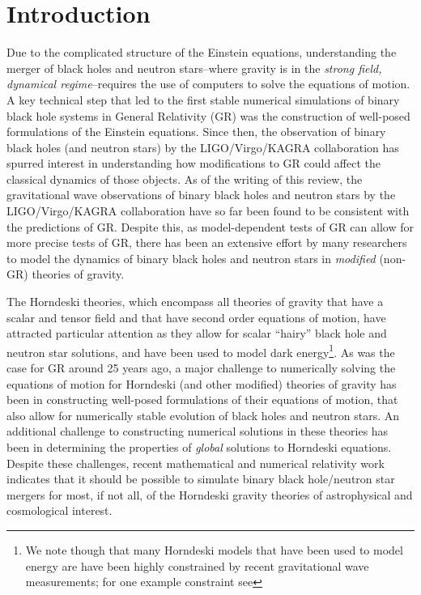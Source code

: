 \documentclass{ws-ijmpd}
\begin{document}
\section{Introduction	
   \label{sec:introduction}
}
Due to the complicated structure of the Einstein equations,
understanding the merger of black holes and neutron stars--where 
gravity is in the
\emph{strong field, dynamical regime}--requires the use of
computers to solve the equations of motion\cite{alcubierre2008introduction,
baumgarte2010numerical}. 
A key technical step that led to the first stable numerical
simulations of binary black hole systems in General Relativity (GR)
was the construction of well-posed formulations of the  Einstein 
equations\cite{Pretorius:2005gq,
Campanelli:2005dd,Baker:2005vv,Pretorius:2007nq}.
Since then, the observation of binary black holes (and neutron stars)
by the LIGO/Virgo/KAGRA
collaboration\cite{LIGOScientific:2016aoc,
LIGOScientific:2016sjg,LIGOScientific:2017vwq} 
has spurred interest in understanding how modifications to GR
could affect the classical dynamics of those objects\cite{Yunes:2013dva,
Berti:2015itd,Foucart:2022iwu}. 
As of the writing of this review,
the gravitational wave observations of binary black holes and neutron
stars by the LIGO/Virgo/KAGRA collaboration have so far
been found to be consistent with the predictions of 
GR\cite{Yunes:2013dva,LIGOScientific:2016lio,LIGOScientific:2019fpa,
LIGOScientific:2020tif,Krishnendu:2021fga}.
Despite this,  
as model-dependent tests of GR can allow for more precise tests of GR,
there has been an extensive effort by many researchers
to model the dynamics of binary black holes
and neutron stars in \emph{modified} (non-GR) 
theories of gravity\cite{Berti:2015itd,Foucart:2022iwu}.

The Horndeski theories\cite{horndeski_paper,Deffayet:2009wt,Deffayet:2011gz},
which encompass all theories of gravity
that have a scalar and tensor field and that have second 
order equations of motion, have attracted particular attention
as they allow for scalar ``hairy'' black hole and neutron
star solutions\cite{Damour:1993hw,Kanti:1995vq,Sotiriou:2013qea},
and have been used to model dark energy\cite{Copeland:2006wr}\footnote{We note
though that many Horndeski models that have been used to model energy
are have been highly constrained by recent gravitational 
wave measurements; for one example constraint see
}.
As was the case for GR around 25 years ago, 
a major challenge to numerically solving the equations
of motion for Horndeski (and other modified) theories 
of gravity has been in constructing 
well-posed formulations of their equations of motion, that also
allow for numerically stable evolution of black holes 
and neutron stars\cite{Cayuso:2017iqc,
Allwright:2018rut,Bernard:2019fjb,Kovacs:2019jqj,
Witek:2020uzz,Kovacs:2020pns,Kovacs:2020ywu}.
An additional challenge to constructing numerical solutions
in these theories has been in determining the properties of 
\emph{global} solutions to Horndeski equations.
Despite these challenges, recent mathematical and numerical
relativity work indicates that it should be 
possible to simulate binary black hole/neutron star 
mergers for most, if not all, of the Horndeski gravity theories of
astrophysical and cosmological interest.
\end{document}
